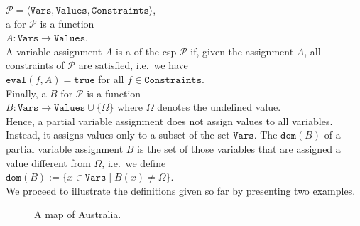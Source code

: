  $\mathcal{P} = \langle \mathtt{Vars}, \mathtt{Values}, \mathtt{Constraints} \rangle$, 
\\[0.2cm]
a  for $\mathcal{P}$ is a function 
\\[0.2cm]
\hspace*{1.3cm}
$A: \mathtt{Vars} \rightarrow \mathtt{Values}$.
\\[0.2cm]
A variable assignment $A$ is a  of the \ac{csp} $\mathcal{P}$ 
if, given the assignment $A$, all constraints of $\mathcal{P}$ are satisfied, i.e.~we have
\\[0.2cm]
\hspace*{1.3cm}
$\mathtt{eval}(f, A) = \mathtt{true}$ \quad for all $f \in \mathtt{Constraints}$.
\\[0.2cm]
Finally, a  $B$ for $\mathcal{P}$ is a function 
\\[0.2cm]
\hspace*{1.3cm}
$B: \mathtt{Vars} \rightarrow \mathtt{Values} \cup \{ \Omega \}$ \quad where $\Omega$ denotes the undefined value.
\\[0.2cm]
Hence, a partial variable assignment does not assign values to all variables.  Instead, it assigns values only
to a subset of the set $\mathtt{Vars}$.  The  $\mathtt{dom}(B)$ of a partial variable assignment $B$ is the
set of those variables that are assigned a value different from $\Omega$, i.e.~we define
\\[0.2cm]
\hspace*{1.3cm}
$\mathtt{dom}(B) := \bigl\{ x \in \mathtt{Vars} \mid B(x) \not= \Omega \bigr\}$.
\\[0.2cm]
We proceed to illustrate the definitions given so far by presenting two examples.


\begin{figure}[!ht]
  \centering
  \caption{A map of Australia.}
  \label{fig:australia.pdf}
\end{figure}

